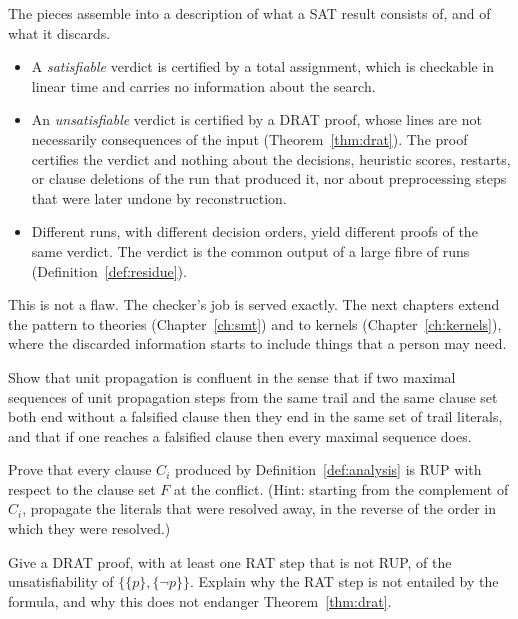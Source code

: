 The pieces assemble into a description of what a SAT result consists of, and of what it discards.
\begin{itemize}[nosep]
\item A \emph{satisfiable} verdict is certified by a total assignment, which is checkable in linear time and carries no information about the search.
\item An \emph{unsatisfiable} verdict is certified by a DRAT proof, whose lines are not necessarily consequences of the input (Theorem~\ref{thm:drat}). The proof certifies the verdict and nothing about the decisions, heuristic scores, restarts, or clause deletions of the run that produced it, nor about preprocessing steps that were later undone by reconstruction.
\item Different runs, with different decision orders, yield different proofs of the same verdict. The verdict is the common output of a large fibre of runs (Definition~\ref{def:residue}).
\end{itemize}
This is not a flaw. The checker's job is served exactly. The next chapters extend the pattern to theories (Chapter~\ref{ch:smt}) and to kernels (Chapter~\ref{ch:kernels}), where the discarded information starts to include things that a person may need.

\begin{exercise}
\label{ex:up-confluent}
Show that unit propagation is confluent in the sense that if two maximal sequences of unit propagation steps from the same trail and the same clause set both end without a falsified clause then they end in the same set of trail literals, and that if one reaches a falsified clause then every maximal sequence does.
\end{exercise}

\begin{exercise}
\label{ex:learned-rup}
Prove that every clause $C_i$ produced by Definition~\ref{def:analysis} is RUP with respect to the clause set $F$ at the conflict. (Hint: starting from the complement of $C_i$, propagate the literals that were resolved away, in the reverse of the order in which they were resolved.)
\end{exercise}

\begin{exercise}
Give a DRAT proof, with at least one RAT step that is not RUP, of the unsatisfiability of $\{\{p\},\{\neg p\}\}$. Explain why the RAT step is not entailed by the formula, and why this does not endanger Theorem~\ref{thm:drat}.
\end{exercise}
